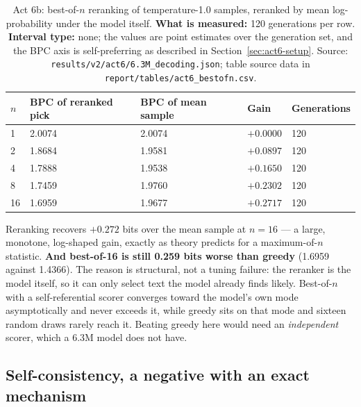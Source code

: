 \documentclass[11pt,a4paper]{article}
\begin{document}
\begin{table}[H]
\centering
\begin{tabular}{L{1.8cm}R{3.0cm}R{3.0cm}R{2.8cm}R{2.0cm}}
\toprule
$n$ & BPC of reranked pick & BPC of mean sample & Gain & Generations \\
 & 2.0074 & 2.0074 & $+0.0000$ & 120 \\
2 & 1.8684 & 1.9581 & $+0.0897$ & 120 \\
4 & 1.7888 & 1.9538 & $+0.1650$ & 120 \\
8 & 1.7459 & 1.9760 & $+0.2302$ & 120 \\
16 & 1.6959 & 1.9677 & $+0.2717$ & 120 \\
\bottomrule
\end{tabular}
\caption{Act 6b: best-of-$n$ reranking of temperature-1.0 samples, reranked by
mean log-probability under the model itself. \textbf{What is measured:} 120
generations per row. \textbf{Interval type:} none; the values are point
estimates over the generation set, and the BPC axis is self-preferring as
described in Section~\ref{sec:act6-setup}. Source:
\texttt{results/v2/act6/6.3M\_decoding.json}; table source data in
\texttt{report/tables/act6\_bestofn.csv}.}
\label{tab:act6-bon}
\end{table}

Reranking recovers $+0.272$ bits over the mean sample at $n = 16$ --- a large,
monotone, log-shaped gain, exactly as theory predicts for a maximum-of-$n$
statistic. \textbf{And best-of-16 is still 0.259 bits worse than greedy}
(1.6959 against 1.4366). The reason is structural, not a tuning failure: the
reranker is the model itself, so it can only select text the model already
finds likely. Best-of-$n$ with a self-referential scorer converges toward the
model's own mode asymptotically and never exceeds it, while greedy sits on that
mode and sixteen random draws rarely reach it. Beating greedy here would need
an \emph{independent} scorer, which a 6.3M model does not have. %


\subsection{Self-consistency, a negative with an exact mechanism}
\label{sec:act6-sc}
\end{document}
